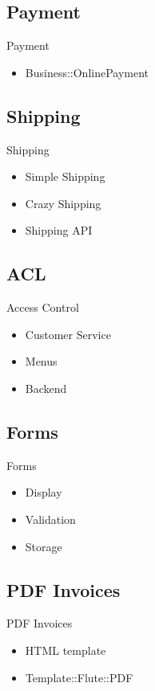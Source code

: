 \subsection{Payment}
\begin{frame}{Payment}
\begin{itemize}
\item Business::OnlinePayment
\end{itemize}
\end{frame}

\subsection{Shipping}
\begin{frame}{Shipping}
\begin{itemize}
\item Simple Shipping
\item Crazy Shipping
\item Shipping API
\end{itemize}
\end{frame}

\subsection{ACL}
\begin{frame}{Access Control}
\begin{itemize}
\item Customer Service
\item Menus
\item Backend
\end{itemize}
\end{frame}

\subsection{Forms}
\begin{frame}{Forms}
\begin{itemize}
\item Display
\item Validation
\item Storage
\end{itemize}
\end{frame}

\subsection{PDF Invoices}
\begin{frame}{PDF Invoices}
\begin{itemize}
\item HTML template
\item Template::Flute::PDF
\end{itemize}
\end{frame}

